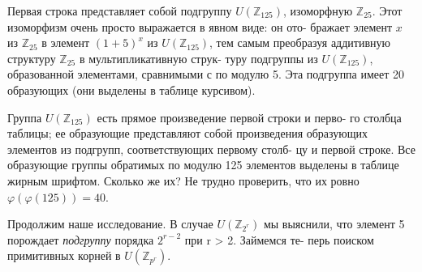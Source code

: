 \documentclass{../template/mai_book}
\begin{document}
Первая строка представляет собой подгруппу $U(\mathbb{Z}_{125})$, изоморфную \linebreak $\mathbb{Z}_{25}$. Этот изоморфизм очень просто выражается в явном виде: он ото- \linebreak бражает элемент $x$ из $\mathbb{Z}_{25}$ в элемент $(1+5)^x$ из $U(\mathbb{Z}_{125})$, тем самым \linebreak преобразуя аддитивную структуру $\mathbb{Z}_{25}$ в мультипликативную струк- \linebreak туру подгруппы из $U(\mathbb{Z}_{125})$, образованной элементами, сравнимыми с  по модулю 5. Эта подгруппа имеет 20 образующих (они выделены в \linebreak таблице курсивом). \par 
Группа $U(\mathbb{Z}_{125})$ есть прямое произведение первой строки и перво- \linebreak го столбца таблицы; ее образующие представляют собой произведения \linebreak образующих элементов из подгрупп, соответствующих первому столб- \linebreak цу и первой строке. Все образующие группы обратимых по модулю 125 \linebreak элементов выделены в таблице жирным шрифтом. Сколько же их? Не \linebreak трудно проверить, что их ровно $\varphi(\varphi(125)) = 40.$ \par
\vspace{\baselineskip}
Продолжим наше исследование. В случае $U(\mathbb{Z}_{{2}^{r}})$ мы выяснили, что \linebreak элемент 5 порождает \textit{подгруппу}  порядка $2^{r-2}$ при r > 2. Займемся те- \linebreak перь поиском примитивных корней в $U(\mathbb{Z}_{{p}^r}).$ \par
\end{document}

